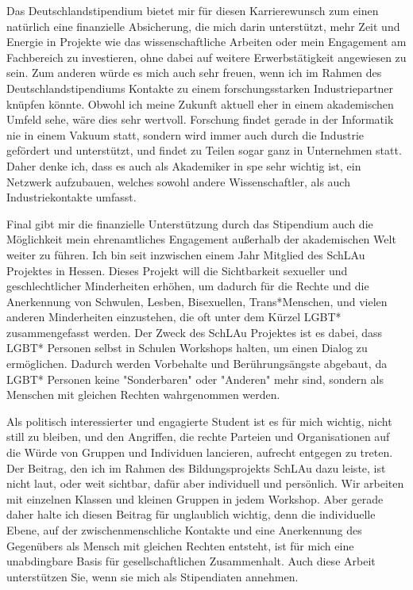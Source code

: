 Das Deutschlandstipendium bietet mir für diesen Karrierewunsch zum einen natürlich eine finanzielle Absicherung, die mich darin unterstützt, mehr Zeit und Energie in Projekte wie das wissenschaftliche Arbeiten oder mein Engagement am Fachbereich zu investieren, ohne dabei auf weitere Erwerbstätigkeit angewiesen zu sein.
Zum anderen würde es mich auch sehr freuen, wenn ich im Rahmen des Deutschlandstipendiums Kontakte zu einem forschungsstarken Industriepartner knüpfen könnte.
Obwohl ich meine Zukunft aktuell eher in einem akademischen Umfeld sehe, wäre dies sehr wertvoll.
Forschung findet gerade in der Informatik nie in einem Vakuum statt, sondern wird immer auch durch die Industrie gefördert und unterstützt, und findet zu Teilen sogar ganz in Unternehmen statt.
Daher denke ich, dass es auch als Akademiker in spe sehr wichtig ist, ein Netzwerk aufzubauen, welches sowohl andere Wissenschaftler, als auch Industriekontakte umfasst.

Final gibt mir die finanzielle Unterstützung durch das Stipendium auch die Möglichkeit mein ehrenamtliches Engagement außerhalb der akademischen Welt weiter zu führen.
Ich bin seit inzwischen einem Jahr Mitglied des SchLAu Projektes in Hessen.
Dieses Projekt will die Sichtbarkeit sexueller und geschlechtlicher Minderheiten erhöhen, um dadurch für die Rechte und die Anerkennung von Schwulen, Lesben, Bisexuellen, Trans*Menschen, und vielen anderen Minderheiten einzustehen, die oft unter dem Kürzel LGBT* zusammengefasst werden.
Der Zweck des SchLAu Projektes ist es dabei, dass LGBT* Personen selbst in Schulen Workshops halten, um einen Dialog zu ermöglichen.
Dadurch werden Vorbehalte und Berührungsängste abgebaut, da LGBT* Personen keine "Sonderbaren" oder "Anderen" mehr sind, sondern als Menschen mit gleichen Rechten wahrgenommen werden.

Als politisch interessierter und engagierte Student ist es für mich wichtig, nicht still zu bleiben, und den Angriffen, die rechte Parteien und Organisationen auf die Würde von Gruppen und Individuen lancieren, aufrecht entgegen zu treten.
Der Beitrag, den ich im Rahmen des Bildungsprojekts SchLAu dazu leiste, ist nicht laut, oder weit sichtbar, dafür aber individuell und persönlich.
Wir arbeiten mit einzelnen Klassen und kleinen Gruppen in jedem Workshop.
Aber gerade daher halte ich diesen Beitrag für unglaublich wichtig, denn die individuelle Ebene, auf der zwischenmenschliche Kontakte und eine Anerkennung des Gegenübers als Mensch mit gleichen Rechten entsteht, ist für mich eine unabdingbare Basis für gesellschaftlichen Zusammenhalt.
Auch diese Arbeit unterstützen Sie, wenn sie mich als Stipendiaten annehmen.

